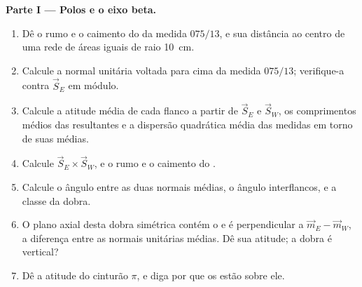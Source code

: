 \begin{problem}
\medskip\noindent\textbf{Parte I --- Polos e o eixo beta.}
\begin{enumerate}
  \item Dê o rumo e o caimento do  da medida $075/13$, e
        sua distância ao centro de uma rede de áreas iguais de raio
        \qty{10}{cm}.
  \item Calcule a normal unitária voltada para cima da medida $075/13$; verifique-a
        contra $\vec S_E$ em módulo.
  \item Calcule a atitude média de cada flanco a partir de $\vec S_E$ e $\vec S_W$,
        os comprimentos médios das resultantes e a dispersão quadrática média das
        medidas em torno de suas médias.
  \item Calcule $\vec S_E\times\vec S_W$, e o rumo e o caimento do
        .
  \item Calcule o ângulo entre as duas normais médias, o ângulo interflancos,
        e a classe da dobra.
  \item O plano axial desta dobra simétrica contém o  e é
        perpendicular a $\vec m_E - \vec m_W$, a diferença entre as normais unitárias
        médias. Dê sua atitude; a dobra é vertical?
  \item Dê a atitude do cinturão $\pi$, e diga por que os  estão sobre
        ele.
\end{enumerate}


\end{problem}
